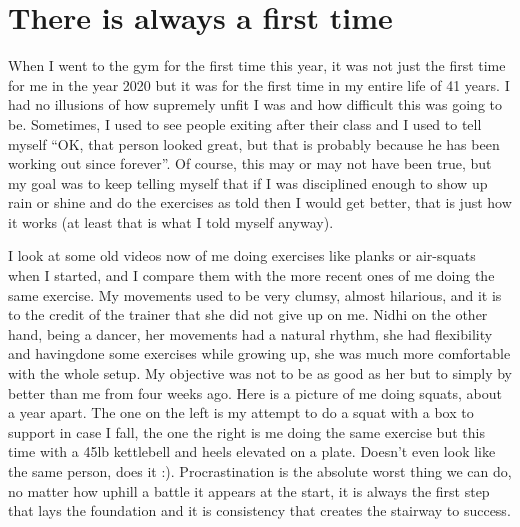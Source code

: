 \documentclass[
  oneside]{book}
\begin{document}
\hypertarget{there-is-always-a-first-time}{%
\section{There is always a first time}\label{there-is-always-a-first-time}}

When I went to the gym for the first time this year, it was not just the first time for me in the year 2020 but it was for the first time in my entire life of 41 years. I had no illusions of how supremely unfit I was and how difficult this was going to be. Sometimes, I used to see people exiting after their class and I used to tell myself ``OK, that person looked great, but that is probably because he has been working out since forever''. Of course, this may or may not have been true, but my goal was to keep telling myself that if I was disciplined enough to show up rain or shine and do the exercises as told then I would get better, that is just how it works (at least that is what I told myself anyway).

I look at some old videos now of me doing exercises like planks or air-squats when I started, and I compare them with the more recent ones of me doing the same exercise. My movements used to be very clumsy, almost hilarious, and it is to the credit of the trainer that she did not give up on me. Nidhi on the other hand, being a dancer, her movements had a natural rhythm, she had flexibility and havingdone some exercises while growing up, she was much more comfortable with the whole setup. My objective was not to be as good as her but to simply by better than me from four weeks ago. Here is a picture of me doing squats, about a year apart. The one on the left is my attempt to do a squat with a box to support in case I fall, the one the right is me doing the same exercise but this time with a 45lb kettlebell and heels elevated on a plate. Doesn't even look like the same person, does it :). Procrastination is the absolute worst thing we can do, no matter how uphill a battle it appears at the start, it is always the first step that lays the foundation and it is consistency that creates the stairway to success.
\end{document}
